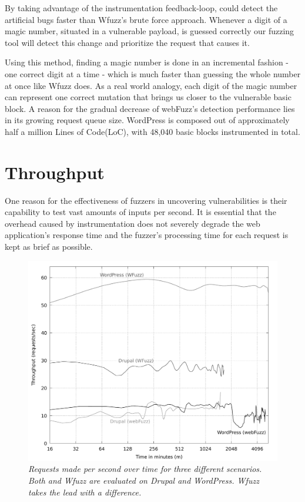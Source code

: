 By taking advantage of the instrumentation feedback-loop, \pname{} could detect the artificial bugs faster than Wfuzz's brute force approach. Whenever a digit of a magic
number, situated in a vulnerable payload, is guessed correctly our fuzzing tool will detect this change and prioritize the request that causes it. 

Using this method, finding a magic number is done in an incremental fashion - one correct digit at a time - which is much faster than guessing the whole number at once like Wfuzz does. As a real world analogy, each digit of the magic number can represent one correct mutation that brings us closer to the vulnerable basic block. A reason for the gradual decrease of webFuzz's detection performance lies in its growing request queue size. WordPress is composed out of approximately half a million Lines of Code(LoC), with 48,040 basic blocks instrumented in total.

\section{Throughput}
One reason for the effectiveness of fuzzers in uncovering vulnerabilities is their capability to test vast amounts of inputs per second. It is essential that the overhead caused by instrumentation does not severely degrade the web application's response time and the fuzzer's processing time for each request is kept as brief as possible.

\begin{figure}[!htb]
  \centering \includegraphics[width=\linewidth]{figures/plot_throughput.pdf}
  \captionsetup{justification=centering}  
  \caption[Throughput of \pname{} and Wfuzz when fuzzing Drupal and WordPress]{\textit{Requests made per second over time for three different scenarios. Both \pname{} and Wfuzz are evaluated on Drupal and WordPress. Wfuzz takes the lead with a difference.}} 
  \label{fig:plot_throughput}
\end{figure}

